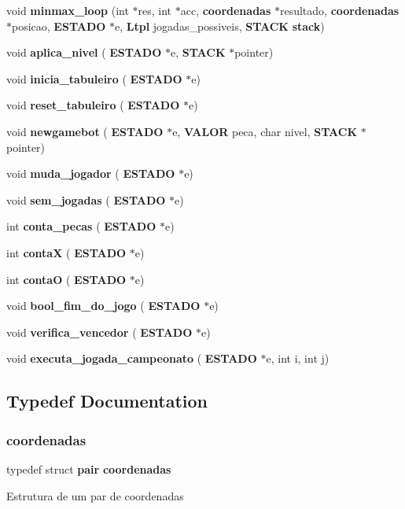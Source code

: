 \begin{DoxyCompactItemize}
\item 
void \textbf{ minmax\+\_\+loop} (int $\ast$res, int $\ast$acc, \textbf{ coordenadas} $\ast$resultado, \textbf{ coordenadas} $\ast$posicao, \textbf{ E\+S\+T\+A\+DO} $\ast$e, \textbf{ Ltpl} jogadas\+\_\+possiveis, \textbf{ S\+T\+A\+CK} \textbf{ stack})
\item 
void \textbf{ aplica\+\_\+nivel} (\textbf{ E\+S\+T\+A\+DO} $\ast$e, \textbf{ S\+T\+A\+CK} $\ast$pointer)
\item 
void \textbf{ inicia\+\_\+tabuleiro} (\textbf{ E\+S\+T\+A\+DO} $\ast$e)
\item 
void \textbf{ reset\+\_\+tabuleiro} (\textbf{ E\+S\+T\+A\+DO} $\ast$e)
\item 
void \textbf{ newgamebot} (\textbf{ E\+S\+T\+A\+DO} $\ast$e, \textbf{ V\+A\+L\+OR} peca, char nivel, \textbf{ S\+T\+A\+CK} $\ast$pointer)
\item 
void \textbf{ muda\+\_\+jogador} (\textbf{ E\+S\+T\+A\+DO} $\ast$e)
\item 
void \textbf{ sem\+\_\+jogadas} (\textbf{ E\+S\+T\+A\+DO} $\ast$e)
\item 
int \textbf{ conta\+\_\+pecas} (\textbf{ E\+S\+T\+A\+DO} $\ast$e)
\item 
int \textbf{ contaX} (\textbf{ E\+S\+T\+A\+DO} $\ast$e)
\item 
int \textbf{ contaO} (\textbf{ E\+S\+T\+A\+DO} $\ast$e)
\item 
void \textbf{ bool\+\_\+fim\+\_\+do\+\_\+jogo} (\textbf{ E\+S\+T\+A\+DO} $\ast$e)
\item 
void \textbf{ verifica\+\_\+vencedor} (\textbf{ E\+S\+T\+A\+DO} $\ast$e)
\item 
void \textbf{ executa\+\_\+jogada\+\_\+campeonato} (\textbf{ E\+S\+T\+A\+DO} $\ast$e, int i, int j)
\end{DoxyCompactItemize}


\subsection{Typedef Documentation}
\mbox{\label{jogar_8h_a39bae05a663acf0194d632fed3c9785d}} 
\subsubsection{coordenadas}
{\footnotesize\ttfamily typedef struct \textbf{ pair} \textbf{ coordenadas}}

Estrutura de um par de coordenadas \mbox{\label{jogar_8h_a4c16ba3c5ef89333eec035e7cd00cded}} 
